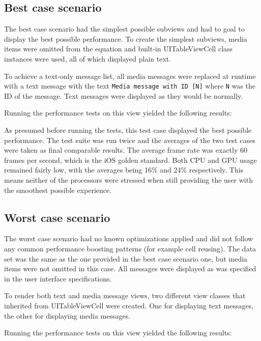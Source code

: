 \documentclass[a4paper,12pt]{article}
\begin{document}
\subsection{Best case scenario}
\label{sec:best-case-scenario}
The best case scenario had the simplest possible subviews and had to goal to display the best possible performance. To create the simplest subviews, media items were omitted from the equation and built-in UITableViewCell class instances were used, all of which displayed plain text.

To achieve a text-only message list, all media messages were replaced at runtime with a text message with the text \texttt{Media message with ID [N]} where \texttt{N} was the ID of the message. Text messages were displayed as they would be normally.

Running the performance tests on this view yielded the following results:

As presumed before running the tests, this test case displayed the best possible performance. The test suite was run twice and the averages of the two test cases were taken as final comparable results. The average frame rate was exactly 60 frames per second, which is the iOS golden standard\cite{IntroducingAsyncDisplayKit}. Both CPU and GPU usage remained fairly low, with the averages being 16\% and 24\% respectively. This means neither of the processors were stressed when still providing the user with the smoothest possible experience.

\subsection{Worst case scenario}
\label{sec:worst-case-scenario}
The worst case scenario had no known optimizations applied and did not follow any common performance boosting patterns (for example cell reusing). The data set was the same as the one provided in the best case scenario one, but media items were not omitted in this case. All messages were displayed as was specified in the user interface specifications.

To render both text and media message views, two different view classes that inherited from UITableViewCell were created. One for displaying text messages, the other for displaying media messages.

Running the performance tests on this view yielded the following results:
\end{document}
